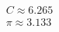 \documentclass[preview]{standalone}
\begin{document}
\begin{align*}
C \approx 6.265 \\\pi \approx 3.133
\end{align*}
\end{document}
